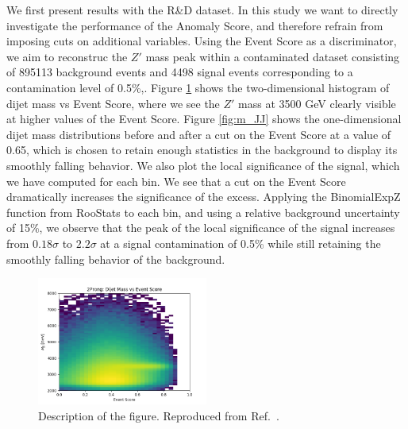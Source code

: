 \documentclass[letterpaper,11pt]{article}
\begin{document}

We first present results with the R\&D dataset. In this study we want to directly investigate the performance of the Anomaly Score, and therefore refrain from imposing cuts on additional variables. Using the Event Score as a discriminator, we aim to reconstruc the $Z'$ mass peak within a contaminated dataset consisting of 895113 background events and 4498 signal events corresponding to a contamination level of 0.5\%,. Figure \ref{fig:m_v_s} shows the two-dimensional histogram of dijet mass vs Event Score, where we see the $Z'$ mass at 3500 GeV clearly visible at higher values of the Event Score. Figure \ref{fig:m_JJ} shows the one-dimensional dijet mass distributions before and after a cut on the Event Score at a value of 0.65, which is chosen to retain enough statistics in the background to display its smoothly falling behavior. We also plot the local significance of the signal, which we have computed for each bin. We see that a cut on the Event Score dramatically increases the significance of the excess. Applying the BinomialExpZ function from RooStats to each bin, and using a relative background uncertainty of 15\%, we observe that the peak of the local significance of the signal increases from $0.18\sigma$ to $2.2\sigma$ at a signal contamination of 0.5\% while still retaining the smoothly falling behavior of the background.\begin{figure}[h!]
\centering
\includegraphics[width=0.5\textwidth]{imgs/ProcR_2Prong_Contaminated_10p0_2Prong_Contaminated_10p0_Weights_Event_ConstOnly_Avg_JJ_M_vs_Event_Score.png}
\caption{Description of the figure.  Reproduced from Ref.~\cite{Nachman:2020lpy}.}
\label{fig:m_v_s}
\end{figure}
\end{document}
